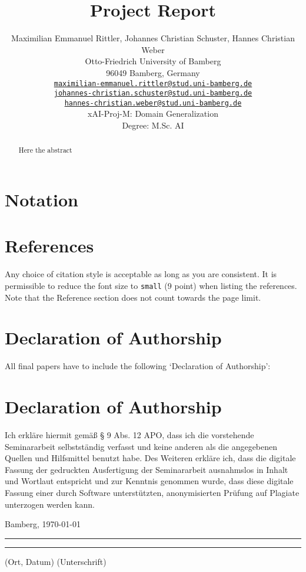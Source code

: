 \documentclass[a4paper]{article}
\title{Project Report}
\author{%
 Maximilian Emmanuel Rittler, Johannes Christian Schuster, Hannes Christian Weber %
    \\
  Otto-Friedrich University of Bamberg\\
  96049 Bamberg, Germany\\
  \href{mailto:maximilian-emmanuel.rittler@stud.uni-bamberg.de}{\texttt{maximilian-emmanuel.rittler@stud.uni-bamberg.de}} \\
  \href{mailto:johannes-christian.schuster@stud.uni-bamberg.de}{\texttt{johannes-christian.schuster@stud.uni-bamberg.de}}
   \\
   \href{mailto:hannes-christian.weber@stud.uni-bamberg.de}{\texttt{hannes-christian.weber@stud.uni-bamberg.de}}\\[0.5cm]
  xAI-Proj-M: Domain Generalization \\
  Degree: M.Sc. AI
}
\begin{document}
\maketitle
\def\va{{\bm{a}}}

\begin{abstract}
  Here the abstract
\end{abstract}








\section{Notation}


\section*{References}

Any choice of citation style is acceptable as long as you are
consistent. It is permissible to reduce the font size to \verb+small+ (9 point)
when listing the references.
Note that the Reference section does not count towards the page limit.
\medskip







\section*{Declaration of Authorship}
All final papers have to include the following ‘Declaration of Authorship’:

{\parindent 0cm
\section*{Declaration of Authorship}
Ich erkläre hiermit gemäß § 9 Abs. 12 APO, dass ich die vorstehende Seminararbeit selbstständig verfasst und keine anderen als die angegebenen Quellen und Hilfsmittel benutzt habe. Des Weiteren erkläre ich, dass die digitale Fassung der gedruckten Ausfertigung der Seminararbeit ausnahmslos in Inhalt und Wortlaut entspricht und zur Kenntnis genommen wurde, dass diese digitale Fassung einer durch Software unterstützten, anonymisierten Prüfung auf Plagiate unterzogen werden kann.\\
\vspace{2\baselineskip}
  
Bamberg, \today

\rule[0.5em]{14em}{0.5pt} \hspace{0.25\linewidth}\rule[0.5em]{14em}{0.5pt}
\vspace{1em}
\hspace{4em} (Ort, Datum) \hspace{0.51\linewidth} (Unterschrift)
}
\end{document}

